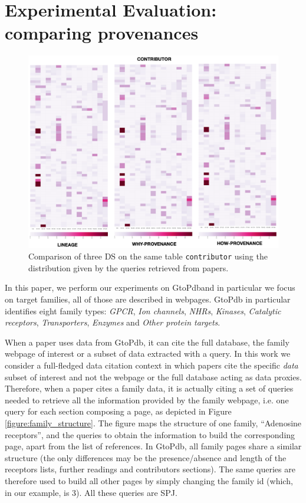 \section{Experimental Evaluation: comparing provenances}
\label{sec:experiments}

\begin{figure}[t]
  \includegraphics[width=1\textwidth]{figures/paper_based_comparison}
  \caption{Comparison of three DS on the same table \texttt{contributor} using the distribution given by the queries retrieved from papers.}
  \label{figure:comparison_on_papers}
\end{figure}

In this paper, we perform our experiments on GtoPdband in particular we focus on target families, all of those are described in webpages. 
GtoPdb in particular identifies eight family types: \emph{GPCR}, \emph{Ion channels}, \emph{NHRs}, \emph{Kinases}, \emph{Catalytic receptors}, \emph{Transporters}, \emph{Enzymes} and \emph{Other protein targets}.  

When a paper uses data from GtoPdb, it can cite the full database, the family webpage of interest or a subset of data extracted with a query. 
In this work we consider a full-fledged data citation context in which papers cite the specific \emph{data} subset of interest and not the webpage or the full database acting as data proxies.  
Therefore, when a paper cites a family data, it is actually citing a set of queries needed to retrieve all the information provided by the family webpage, i.e. one query for each section composing a page, as depicted in Figure \ref{figure:family_structure}. 
The figure maps the structure of one family, ``Adenosine receptors'', and the queries to obtain the information to build the corresponding page, apart from the list of references. 
In GtoPdb, all family pages share a similar structure (the only differences may be the presence/absence and length of the receptors lists, further readings and contributors sections).
The same queries are therefore used to build all other pages by simply changing the family id (which, in our example, is 3). All these queries are SPJ. 

